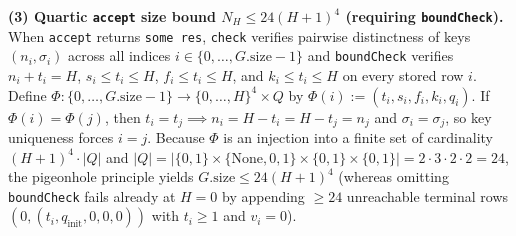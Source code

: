 \documentclass[11pt,a4paper]{article}
\begin{document}
\textbf{(3) Quartic \texttt{accept} size bound \(N_H \le 24(H+1)^4\)
(requiring \texttt{boundCheck}).} When \texttt{accept} returns
\texttt{some\ res}, \texttt{check} verifies pairwise distinctness of
keys \((n_i, \sigma_i)\) across all indices
\(i \in \{0, \dots, G.\mathrm{size} - 1\}\) and \texttt{boundCheck}
verifies \(n_i + t_i = H\), \(s_i \le t_i \le H\),
\(f_i \le t_i \le H\), and \(k_i \le t_i \le H\) on every stored row
\(i\). Define
\(\Phi: \{0, \dots, G.\mathrm{size} - 1\} \to \{0, \dots, H\}^4 \times Q\)
by \(\Phi(i) := (t_i, s_i, f_i, k_i, q_i)\). If \(\Phi(i) = \Phi(j)\),
then \(t_i = t_j \implies n_i = H - t_i = H - t_j = n_j\) and
\(\sigma_i = \sigma_j\), so key uniqueness forces \(i = j\). Because
\(\Phi\) is an injection into a finite set of cardinality
\((H + 1)^4 \cdot |Q|\) and
\(|Q| = |\{0,1\} \times \{\mathrm{None},0,1\} \times \{0,1\} \times \{0,1\}| = 2 \cdot 3 \cdot 2 \cdot 2 = 24\),
the pigeonhole principle yields \(G.\mathrm{size} \le 24(H + 1)^4\)
(whereas omitting \texttt{boundCheck} fails already at \(H = 0\) by
appending \(\ge 24\) unreachable terminal rows
\((0, (t_i, q_{\mathrm{init}}, 0, 0, 0))\) with \(t_i \ge 1\) and
\(v_i = 0\)).
\end{document}
